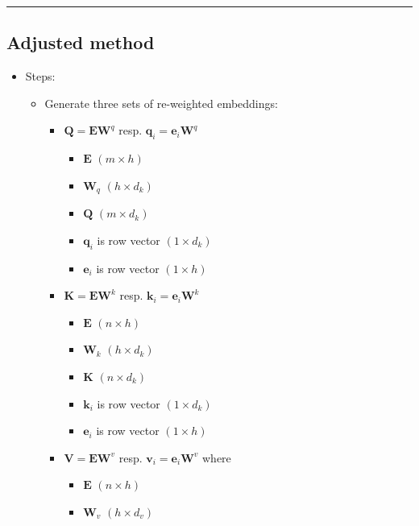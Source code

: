 {\color{black}\hrule height 0.001mm}

\subsection*{Adjusted method}
\begin{itemize}
    \item Steps:
    \begin{itemize}
        \item Generate three sets of re-weighted embeddings: 
        \begin{itemize}
            \item $\boldsymbol{Q} = \boldsymbol{E} \boldsymbol{W}^q$ resp. $\boldsymbol{q}_i = \boldsymbol{e}_i \boldsymbol{W}^q$
            \begin{itemize}
                \item $\boldsymbol{E}$ $(m \times h)$
                \item $\boldsymbol{W}_q$ $(h \times d_k)$
                \item $\boldsymbol{Q}$ $(m \times d_k)$
                \item $\boldsymbol{q}_i$ is row vector $(1 \times d_k)$
                \item $\boldsymbol{e}_i$ is row vector $(1 \times h)$
            \end{itemize}
            \item $\boldsymbol{K} = \boldsymbol{E} \boldsymbol{W}^k$ resp. $\boldsymbol{k}_i = \boldsymbol{e}_i \boldsymbol{W}^k$
            \begin{itemize}
                \item $\boldsymbol{E}$ $(n \times h)$
                \item $\boldsymbol{W}_k$ $(h \times d_k)$
                \item $\boldsymbol{K}$ $(n \times d_k)$
                \item $\boldsymbol{k}_i$ is row vector $(1 \times d_k)$
                \item $\boldsymbol{e}_i$ is row vector $(1 \times h)$
            \end{itemize}
            \item $\boldsymbol{V} = \boldsymbol{E} \boldsymbol{W}^v$ resp. $\boldsymbol{v}_i = \boldsymbol{e}_i \boldsymbol{W}^v$ where 
            \begin{itemize}
                \item $\boldsymbol{E}$ $(n \times h)$
                \item $\boldsymbol{W}_v$ $(h \times d_v)$

\end{itemize}
\end{itemize}
\end{itemize}
\end{itemize}
